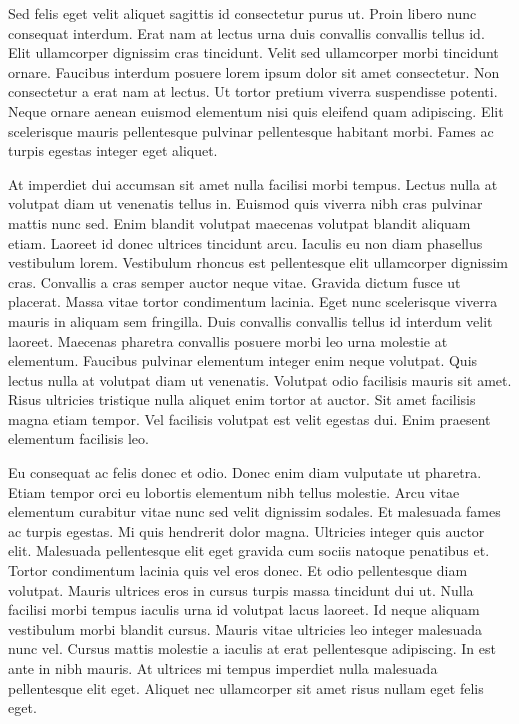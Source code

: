 \documentclass[11pt,a4paper]{article}
\begin{document}
Sed felis eget velit aliquet sagittis id consectetur purus ut. Proin libero nunc consequat interdum. Erat nam at lectus urna duis convallis convallis tellus id. Elit ullamcorper dignissim cras tincidunt. Velit sed ullamcorper morbi tincidunt ornare. Faucibus interdum posuere lorem ipsum dolor sit amet consectetur. Non consectetur a erat nam at lectus. Ut tortor pretium viverra suspendisse potenti. Neque ornare aenean euismod elementum nisi quis eleifend quam adipiscing. Elit scelerisque mauris pellentesque pulvinar pellentesque habitant morbi. Fames ac turpis egestas integer eget aliquet.

At imperdiet dui accumsan sit amet nulla facilisi morbi tempus. Lectus nulla at volutpat diam ut venenatis tellus in. Euismod quis viverra nibh cras pulvinar mattis nunc sed. Enim blandit volutpat maecenas volutpat blandit aliquam etiam. Laoreet id donec ultrices tincidunt arcu. Iaculis eu non diam phasellus vestibulum lorem. Vestibulum rhoncus est pellentesque elit ullamcorper dignissim cras. Convallis a cras semper auctor neque vitae. Gravida dictum fusce ut placerat. Massa vitae tortor condimentum lacinia. Eget nunc scelerisque viverra mauris in aliquam sem fringilla. Duis convallis convallis tellus id interdum velit laoreet. Maecenas pharetra convallis posuere morbi leo urna molestie at elementum. Faucibus pulvinar elementum integer enim neque volutpat. Quis lectus nulla at volutpat diam ut venenatis. Volutpat odio facilisis mauris sit amet. Risus ultricies tristique nulla aliquet enim tortor at auctor. Sit amet facilisis magna etiam tempor. Vel facilisis volutpat est velit egestas dui. Enim praesent elementum facilisis leo.

Eu consequat ac felis donec et odio. Donec enim diam vulputate ut pharetra. Etiam tempor orci eu lobortis elementum nibh tellus molestie. Arcu vitae elementum curabitur vitae nunc sed velit dignissim sodales. Et malesuada fames ac turpis egestas. Mi quis hendrerit dolor magna. Ultricies integer quis auctor elit. Malesuada pellentesque elit eget gravida cum sociis natoque penatibus et. Tortor condimentum lacinia quis vel eros donec. Et odio pellentesque diam volutpat. Mauris ultrices eros in cursus turpis massa tincidunt dui ut. Nulla facilisi morbi tempus iaculis urna id volutpat lacus laoreet. Id neque aliquam vestibulum morbi blandit cursus. Mauris vitae ultricies leo integer malesuada nunc vel. Cursus mattis molestie a iaculis at erat pellentesque adipiscing. In est ante in nibh mauris. At ultrices mi tempus imperdiet nulla malesuada pellentesque elit eget. Aliquet nec ullamcorper sit amet risus nullam eget felis eget.
\end{document}

